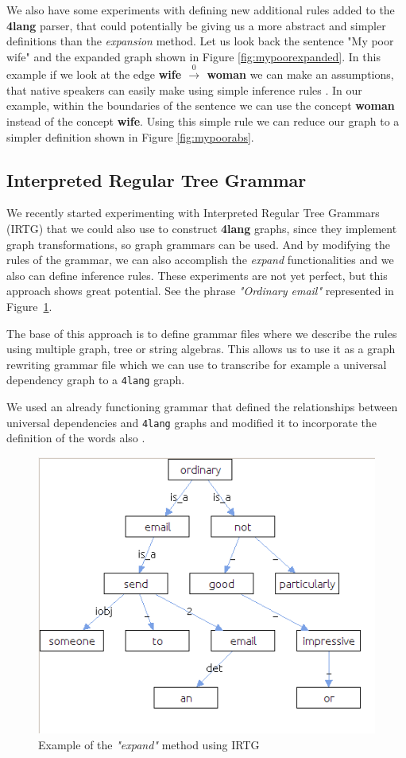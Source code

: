 We also have some experiments with defining new additional rules added to the \textbf{4lang} parser, that could potentially be giving us a more abstract and simpler definitions than the \textit{expansion} method. Let us look back the sentence "My poor wife" and the expanded graph shown in Figure \ref{fig:mypoorexpanded}. In this example if we look at the edge \textbf{wife $\xrightarrow0$ woman} we can make an assumptions, that native speakers can easily make using simple inference rules \cite{Kovacs:2018}. In our example, within the boundaries of the sentence we can use the concept \textbf{woman} instead of the concept \textbf{wife}. Using this simple rule we can reduce our graph to a simpler definition shown in Figure \ref{fig:mypoorabs}.

\subsection{Interpreted Regular Tree Grammar}
We recently started experimenting with Interpreted Regular Tree Grammars \cite{Koller:2011} (IRTG) that we could also use to construct \textbf{4lang} graphs, since they implement graph transformations, so graph grammars can be used. And by modifying the rules of the grammar, we can also accomplish the \textit{expand} functionalities and we also can define inference rules. These experiments are not yet perfect, but this approach shows great potential. See the phrase \textit{"Ordinary email"} represented in Figure~\ref{fig:irtg}.

The base of this approach is to define grammar files where we describe the rules using multiple graph, tree or string algebras. This allows us to use it as a graph rewriting grammar file which we can use to transcribe for example a universal dependency graph to a \texttt{4lang} graph.

We used an already functioning grammar that defined the relationships between universal dependencies and \texttt{4lang} graphs and modified it to incorporate the definition of the words also \cite{AcsEvelin:2018}.

\begin{figure}[h]
	\centering
	\includegraphics[scale=0.4]{irtg.jpg}
	\caption{Example of the \textit{"expand"} method using IRTG}
	\label{fig:irtg}
\end{figure}